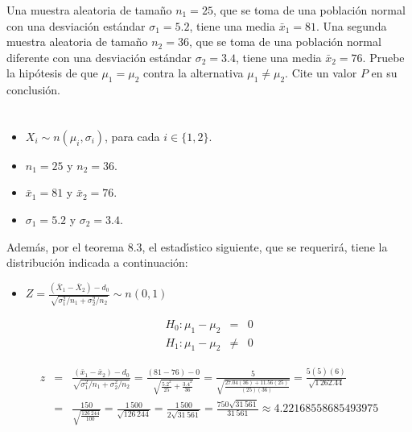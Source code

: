 \begin{enunciado}
 Una muestra aleatoria de tama\~no $n_1 = 25$, que se toma de una poblaci\'on normal con una desviaci\'on est\'andar $\sigma_1 = 5.2$, tiene una media $\bar{x}_1 = 81$. Una segunda muestra aleatoria de tama\~no $n_2 = 36$, que se toma de una poblaci\'on normal diferente con una desviaci\'on est\'andar $\sigma_2 = 3.4$, tiene una media $\bar{x}_2 = 76$. Pruebe la hip\'otesis de que $\mu_1 = \mu_2$ contra la alternativa $\mu_1 \neq \mu_2$. Cite un valor $P$ en su conclusi\'on.
\end{enunciado}

\begin{solucion}
 \begin{datos}
  $\phantom{0}$
  \begin{itemize}
   \item $X_i \sim n\left( \mu_i, \sigma_i \right)$, para cada $i \in \{ 1, 2 \}$.
   \item $n_1 = 25$ y $n_2 = 36$.
   \item $\bar{x}_1 = 81$ y $\bar{x}_2 = 76$.
   \item $\sigma_1 = 5.2$ y $\sigma_2 = 3.4$.
  \end{itemize}
  Adem\'as, por el teorema 8.3,
  el estad\'{\i}stico siguiente, que se requerir\'a,
  tiene la distribuci\'on indicada a continuaci\'on:
  \begin{itemize}
   \item $Z =
   \frac{
   \left( \overline{X}_1 - \overline{X}_2 \right) - d_0
   }{
   \sqrt{\sigma_1^2/n_1 + \sigma_2^2/n_2}
   }
   \sim n(0,1)$
  \end{itemize}
 \end{datos}

 \begin{hipotesis}
  \begin{eqnarray*}
   H_0: \mu_1 - \mu_2 & = & 0 \\
   H_1: \mu_1 - \mu_2 & \neq & 0
  \end{eqnarray*}
 \end{hipotesis}

 \begin{estadistico}
  \begin{eqnarray*}
   z & = & \frac{\left( \bar{x}_1 - \bar{x}_2 \right) - d_0}{\sqrt{\sigma_1^2/n_1 + \sigma_2^2/n_2}} = \frac{(81-76) - 0}{\sqrt{\frac{5.2^2}{25} + \frac{3.4^2}{36}}} = \frac{5}{\sqrt{\frac{27.04(36) + 11.56(25)}{(25)(36)}}} = \frac{5(5)(6)}{\sqrt{1\,262.44}} \\
   & = & \frac{150}{\sqrt{\frac{126\,244}{100}}} = \frac{1\,500}{\sqrt{126\,244}} = \frac{1\,500}{2\sqrt{31\,561}} = \frac{750\sqrt{31\,561}}{31\,561} \approx 4.22168558685493975
  \end{eqnarray*}
 \end{estadistico}


\end{solucion}
